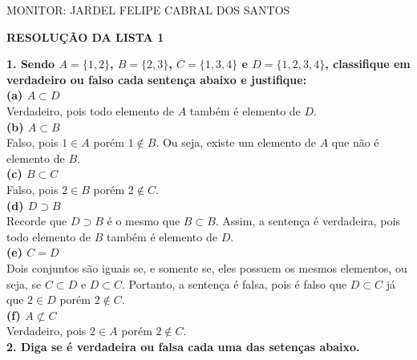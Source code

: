 \documentclass[12pt, a4paper]{article}
\begin{document}
\begin{flushleft}

MONITOR: JARDEL FELIPE CABRAL DOS SANTOS\\[1cm] 
\end{flushleft}

\begin{center} \textbf{RESOLUÇÃO DA LISTA 1}
\end{center}



\textbf{1. Sendo \(A = \{1,2\}\), \(B = \{2,3\}\), \(C = \{1,3,4\}\) e \(D = \{1,2,3,4\}\), classifique em verdadeiro ou falso cada sentença abaixo e justifique:} \\

\textbf{(a) \(A \subset D\)} \\

Verdadeiro, pois todo elemento de \(A\) também é elemento de \(D\). \\

\textbf{(b) \(A \subset B\)} \\

Falso, pois \(1 \in A\) porém \(1 \notin B\). Ou seja, existe um elemento de \(A\) que não é elemento de \(B\).  \\

\textbf{(c) \(B \subset C\)} \\

Falso, pois \(2 \in B\) porém \(2 \notin C\).   \\

\textbf{(d) \(D \supset B\)} \\

Recorde que \(D \supset B\) é o mesmo que \(B \subset B\). Assim, a sentença é verdadeira, pois todo elemento de \(B\) também é elemento de \(D\). \\

\textbf{(e) \(C = D\)} \\

Dois conjuntos são iguais se, e somente se, eles possuem os mesmos elementos, ou seja, se \(C \subset D\) e \(D \subset C\). Portanto, a sentença é falsa, pois é falso que \(D \subset C\) já que \(2 \in D\) porém \(2 \notin C\).    \\

\textbf{(f) \(A \not\subset C\)} \\

Verdadeiro, pois \(2 \in A\) porém \(2 \notin C\). \\
\newpage
\textbf{2. Diga se é verdadeira ou falsa cada uma das setenças abaixo.} \\
\end{document}

